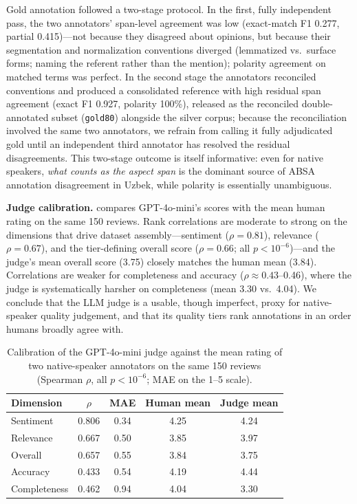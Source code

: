 \documentclass[bdcc,article,submit,moreauthors]{Definitions/mdpi}
\begin{document}
Gold annotation followed a two-stage protocol. In the first, fully independent pass, the two annotators' span-level agreement was low (exact-match F1 0.277, partial 0.415)---not because they disagreed about opinions, but because their segmentation and normalization conventions diverged (lemmatized vs.\ surface forms; naming the referent rather than the mention); polarity agreement on matched terms was perfect. In the second stage the annotators reconciled conventions and produced a consolidated reference with high residual span agreement (exact F1 0.927, polarity 100\%), released as the reconciled double-annotated subset (\texttt{gold80}) alongside the silver corpus; because the reconciliation involved the same two annotators, we refrain from calling it fully adjudicated gold until an independent third annotator has resolved the residual disagreements. This two-stage outcome is itself informative: even for native speakers, \emph{what counts as the aspect span} is the dominant source of ABSA annotation disagreement in Uzbek, while polarity is essentially unambiguous.

\textbf{Judge calibration.}  compares GPT-4o-mini's scores with the mean human rating on the same 150 reviews. Rank correlations are moderate to strong on the dimensions that drive dataset assembly---sentiment ($\rho=0.81$), relevance ($\rho=0.67$), and the tier-defining overall score ($\rho=0.66$; all $p<10^{-6}$)---and the judge's mean overall score (3.75) closely matches the human mean (3.84). Correlations are weaker for completeness and accuracy ($\rho\approx0.43$--0.46), where the judge is systematically harsher on completeness (mean 3.30 vs.\ 4.04). We conclude that the LLM judge is a usable, though imperfect, proxy for native-speaker quality judgement, and that its quality tiers rank annotations in an order humans broadly agree with.

\begin{table}[t]
\centering
\caption{Calibration of the GPT-4o-mini judge against the mean rating of two native-speaker annotators on the same 150 reviews (Spearman $\rho$, all $p<10^{-6}$; MAE on the 1--5 scale).}
\label{tab:judge_calibration}
\begin{tabular}{lcccc}
\toprule
\textbf{Dimension} & \textbf{$\rho$} & \textbf{MAE} & \textbf{Human mean} & \textbf{Judge mean} \\
\midrule
Sentiment    & 0.806 & 0.34 & 4.25 & 4.24 \\
Relevance    & 0.667 & 0.50 & 3.85 & 3.97 \\
Overall      & 0.657 & 0.55 & 3.84 & 3.75 \\
Accuracy     & 0.433 & 0.54 & 4.19 & 4.44 \\
Completeness & 0.462 & 0.94 & 4.04 & 3.30 \\
\bottomrule
\end{tabular}
\end{table}
\end{document}
